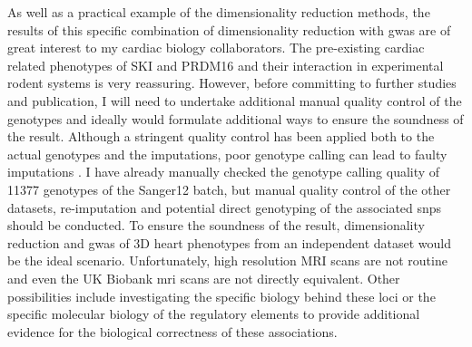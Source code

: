 As well as a practical example of the dimensionality reduction methods, the results of this specific combination of dimensionality reduction with \gls{gwas} are of great interest to my cardiac biology collaborators. The pre-existing cardiac related phenotypes of SKI and PRDM16 and their interaction in experimental rodent systems is very reassuring. However, before committing to further studies and publication, I will need to undertake additional manual quality control of the genotypes and ideally would formulate additional ways to ensure the soundness of the result. Although a stringent quality control has been applied both to the actual genotypes and the imputations, poor genotype calling can lead to faulty imputations \citep{Morris2010}. I have already manually checked the genotype calling quality of \num{11377} genotypes of the Sanger12 batch, but manual quality control of the other datasets, re-imputation and potential direct genotyping of the associated \glspl{snp} should be conducted. To ensure the soundness of the result, dimensionality reduction and \gls{gwas} of 3D heart phenotypes from an independent dataset would be the ideal scenario. Unfortunately, high resolution MRI scans are not routine and even the UK Biobank \gls{mri} scans are not directly equivalent. Other possibilities include investigating the specific biology behind these loci or the specific molecular biology of the regulatory elements to provide additional evidence for the biological correctness of these associations.

